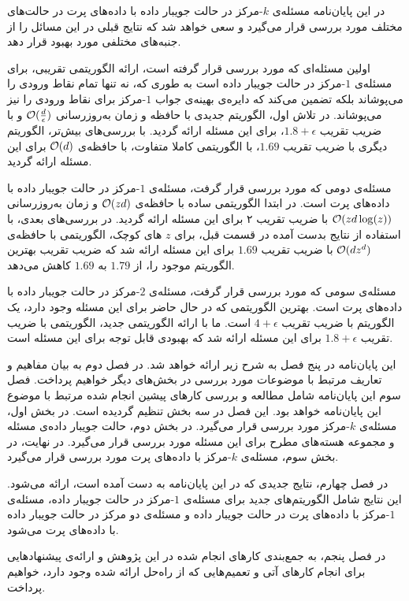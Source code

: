 
در این پایان‌نامه مسئله‌ی $k$-مرکز  در حالت جویبار داده با داده‌های پرت در حالت‌های مختلف مورد بررسی قرار می‌گیرد و سعی خواهد شد که نتایج قبلی در این مسائل را از جنبه‌های مختلفی مورد بهبود قرار دهد.

اولین مسئله‌ای که مورد بررسی قرار گرفته است، ارائه الگوریتمی تقریبی، برای مسئله‌ی $1$-مرکز در حالت جویبار داده است به طوری که، نه تنها تمام نقاط ورودی را می‌پوشاند بلکه تضمین می‌کند که دایره‌ی بهینه‌‌ی جواب $1$-مرکز برای نقاط ورودی را نیز‌ می‌پوشاند. در تلاش‌ اول، الگوریتم جدیدی با حافظه‌ و زمان به‌روزرسانی $\mathcal{O}(\frac{d}{\epsilon})$ و  با ضریب تقریب $1.8 + \epsilon$، برای این مسئله ارائه گردید. با بررسی‌های بیش‌تر، الگوریتم دیگری با ضریب تقریب $1.69$، با الگوریتمی کاملا متفاوت، با حافظه‌ی $\mathcal{O}(d)$ برای این مسئله ارائه گردید.

مسئله‌ی دومی که مورد بررسی قرار گرفت، مسئله‌ی $1$-مرکز‌ در حالت جویبار داده با داده‌های پرت است. در ابتدا الگوریتمی ساده با حافظه‌ی $\mathcal{O}(zd)$ و زمان به‌روزرسانی $\mathcal{O}(zd\log(z))$ با ضریب تقریب ۲ برای این مسئله ارائه گردید. در بررسی‌های بعدی، با استفاده از‌ نتایج بدست آمده در قسمت قبل، برای $z$ های کوچک، الگوریتمی با حافظه‌ی $\mathcal{O}(dz^d)$ با ضریب تقریب $1.69$ برای این مسئله ارائه شد که ضریب تقریب بهترین الگوریتم موجود را، از $1.79$ به $1.69$ کاهش می‌دهد.

مسئله‌ی سومی که مورد بررسی قرار گرفت، مسئله‌ی $2$-مرکز در حالت جویبار داده با داده‌های پرت است. بهترین الگوریتمی که در حال حاضر برای این مسئله وجود دارد، یک الگوریتم با ضریب تقریب $4 + \epsilon$ است. ما با ارائه‌ الگوریتمی جدید، الگوریتمی با ضریب تقریب $1.8 + \epsilon$ برای این مسئله ارائه شد که بهبودی قابل توجه برای این مسئله است.
 


این پایان‌نامه در پنج‌ فصل به شرح زیر ارائه خواهد شد. در فصل دوم به بیان مفاهیم و تعاریف مرتبط با موضوعات مورد بررسی در بخش‌های دیگر خواهیم پرداخت. فصل سوم این پایان‌نامه شامل مطالعه و بررسی کارهای پیشین انجام شده مرتبط با موضوع این پایان‌نامه خواهد بود. این فصل در سه بخش تنظیم گردیده است. در بخش اول، مسئله‌ی $k$-مرکز مورد بررسی قرار می‌گیرد. در بخش دوم، حالت جویبار داده‌ی مسئله و مجموعه هسته‌های مطرح برای این مسئله مورد بررسی قرار می‌گیرد. در نهایت، در بخش سوم، مسئله‌ی $k$-مرکز‌ با داده‌های پرت مورد بررسی قرار می‌گیرد.

در فصل چهارم، نتایج جدیدی که در این پایان‌نامه به دست آمده است، ارائه می‌شود. این نتایج شامل الگوریتم‌های جدید برای مسئله‌ی $1$-مرکز در حالت جویبار داده،  مسئله‌ی $1$-مرکز‌ با داده‌های پرت در حالت جویبار داده و مسئله‌ی دو مرکز در حالت جویبار داده با داده‌های پرت می‌شود.

در  فصل پنجم، به جمع‌بندی کارهای انجام شده در این پژوهش و ارائه‌ی پیشنهاد‌هایی برای انجام کارهای آتی و تعمیم‌هایی که از راه‌حل ارائه شده وجود دارد، خواهیم پرداخت.
